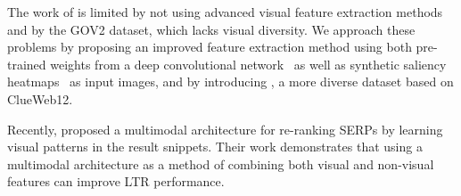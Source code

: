 The work of \citet{fan2017learning} is limited by not using advanced visual feature extraction methods and by the GOV2 dataset, which lacks visual diversity.
We approach these problems by proposing an improved feature extraction method using both pre-trained weights from a deep convolutional network~\cite{simonyan2014very} as well as synthetic saliency heatmaps~\cite{shan2017two} as input images, and by introducing \datasetname, a more diverse dataset based on ClueWeb12.

Recently, \citet{zhang2018relevance} proposed a multimodal architecture for re-ranking \acp{SERP} by learning visual patterns in the result snippets. 
Their work demonstrates that using a multimodal architecture as a method of combining both visual and non-visual features can improve \ac{LTR} performance.





